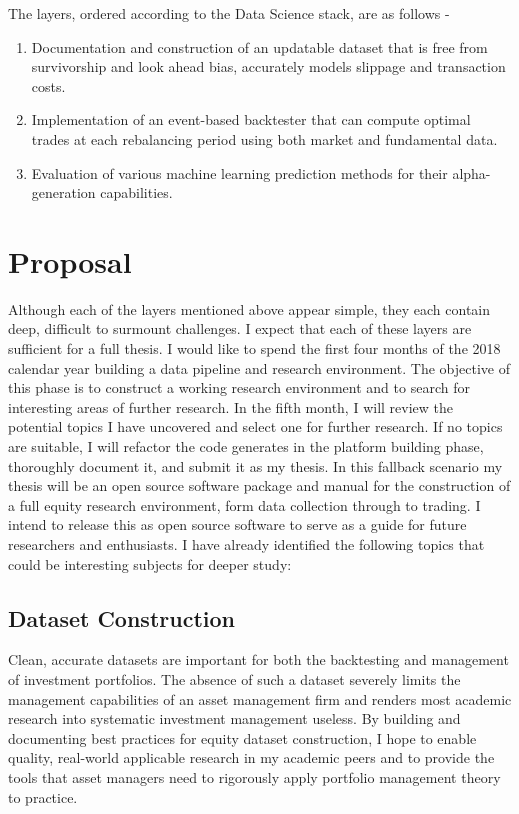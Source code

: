 \documentclass[11pt,preprint, authoryear]{elsarticle}
\numberwithin{equation}{section}
\numberwithin{figure}{section}
\numberwithin{table}{section}
\def\tightlist{} %
\begin{document}
The layers, ordered according to the Data Science stack, are as follows
-

\begin{enumerate}
\def\labelenumi{\arabic{enumi}.}
\tightlist
\item
  Documentation and construction of an updatable dataset that is free
  from survivorship and look ahead bias, accurately models slippage and
  transaction costs.
\item
  Implementation of an event-based backtester that can compute optimal
  trades at each rebalancing period using both market and fundamental
  data.
\item
  Evaluation of various machine learning prediction methods for their
  alpha-generation capabilities.
\end{enumerate}

\section{Proposal}\label{proposal}

Although each of the layers mentioned above appear simple, they each
contain deep, difficult to surmount challenges. I expect that each of
these layers are sufficient for a full thesis. I would like to spend the
first four months of the 2018 calendar year building a data pipeline and
research environment. The objective of this phase is to construct a
working research environment and to search for interesting areas of
further research. In the fifth month, I will review the potential topics
I have uncovered and select one for further research. If no topics are
suitable, I will refactor the code generates in the platform building
phase, thoroughly document it, and submit it as my thesis. In this
fallback scenario my thesis will be an open source software package and
manual for the construction of a full equity research environment, form
data collection through to trading. I intend to release this as open
source software to serve as a guide for future researchers and
enthusiasts. I have already identified the following topics that could
be interesting subjects for deeper study:

\subsection{Dataset Construction}\label{dataset-construction}

Clean, accurate datasets are important for both the backtesting and
management of investment portfolios. The absence of such a dataset
severely limits the management capabilities of an asset management firm
and renders most academic research into systematic investment management
useless. By building and documenting best practices for equity dataset
construction, I hope to enable quality, real-world applicable research
in my academic peers and to provide the tools that asset managers need
to rigorously apply portfolio management theory to practice.
\end{document}
